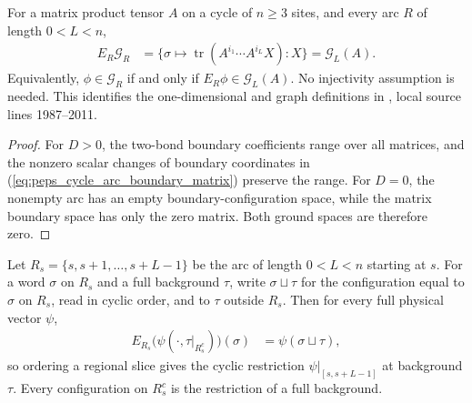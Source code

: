 \begin{lemma}%
    \label{thm:peps_cycle_region_ground_space}
    \leanok
    For a matrix product tensor $A$ on a cycle of $n\geq3$ sites,
    and every arc $R$ of length $0<L<n$,
    \begin{align}
        E_R\mathcal G_R
         & =\{\sigma\mapsto
        \operatorname{tr}(A^{i_1}\cdots A^{i_L}X):X\}
        =\mathcal G_L(A).
        \label{eq:peps_cycle_ground_space}
    \end{align}
    Equivalently, $\phi\in\mathcal G_R$ if and only if
    $E_R\phi\in\mathcal G_L(A)$.
    No injectivity assumption is needed. This identifies the
    one-dimensional and graph definitions in
    \cite[Section~IV.C.1]{Cirac2021Matrix}, local source lines
    1987--2011.
\end{lemma}

\begin{proof}\leanok
    For $D>0$, the two-bond boundary coefficients range over all
    matrices, and the nonzero scalar changes of boundary coordinates
    in (\ref{eq:peps_cycle_arc_boundary_matrix}) preserve the range.
    For $D=0$, the nonempty arc has an empty boundary-configuration
    space, while the matrix boundary space has only the zero matrix.
    Both ground spaces are therefore zero.
\end{proof}

\begin{lemma}
    \label{thm:peps_cycle_slice_restriction}
    \leanok
    Let $R_s=\{s,s+1,\ldots,s+L-1\}$ be the arc of length $0<L<n$
    starting at $s$. For a word $\sigma$ on $R_s$ and a full
    background $\tau$, write $\sigma\sqcup\tau$ for the configuration
    equal to $\sigma$ on $R_s$, read in cyclic order, and to $\tau$
    outside $R_s$. Then for every full physical vector $\psi$,
    \begin{align}
        E_{R_s}\bigl(\psi(\cdot,\tau|_{R_s^c})\bigr)(\sigma)
         & =\psi(\sigma\sqcup\tau),
        \label{eq:peps_cycle_slice_restriction}
    \end{align}
    so ordering a regional slice gives the cyclic restriction
    $\psi|_{[s,s+L-1]}$ at background $\tau$.
    Every configuration on $R_s^c$ is the restriction of a full
    background.
\end{lemma}

